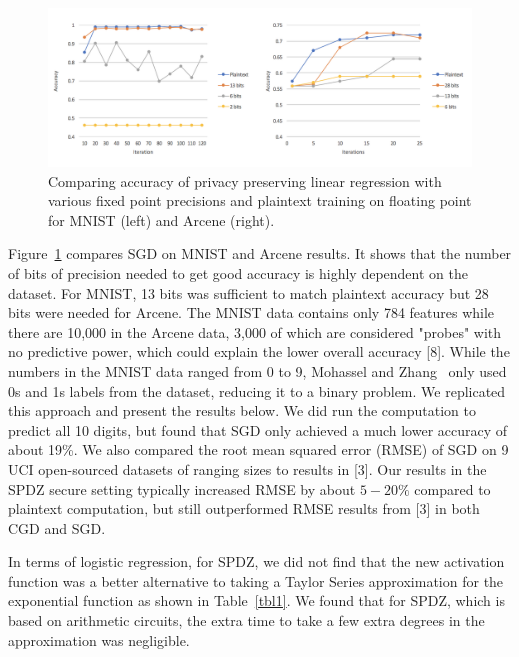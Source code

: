 \documentclass{article}
\begin{document}
\begin{figure}[h!]
\vspace{-4mm}
\centering
  \includegraphics[scale=0.6]{mnistarcene.png}
  \vspace{-4mm}
   \caption{Comparing accuracy of privacy preserving linear regression with various fixed point precisions and plaintext training on floating point for MNIST (left) and Arcene (right).}
   \label{fig:result2}  
\end{figure}

Figure~\ref{fig:result2} compares SGD on MNIST and Arcene results. It shows that the number of bits of precision needed to get good accuracy is highly dependent on the dataset. For MNIST, 13 bits was sufficient to match plaintext accuracy but 28 bits were needed for Arcene. The MNIST data contains only 784 features while there are 10,000 in the Arcene data, 3,000 of which are considered "probes" with no predictive power, which could explain the lower overall accuracy [8]. While the numbers in the MNIST data ranged from 0 to 9, Mohassel and Zhang~\cite{MZ17} only used 0s and 1s labels from the dataset, reducing it to a binary problem. We replicated this approach and present the results below. We did run the computation to predict all 10 digits, but found that SGD only achieved a much lower accuracy of about 19\%. We also compared the root mean squared error (RMSE) of SGD on 9 UCI open-sourced datasets of ranging sizes to results in [3]. Our results in the SPDZ secure setting typically increased RMSE by about $5-20\%$ compared to plaintext computation, but still outperformed RMSE results from [3] in both CGD and SGD.

In terms of logistic regression, for SPDZ, we did not find that the new activation function was a better alternative to taking a Taylor Series approximation for the exponential function as shown in Table~\ref{tbl1}. We found that for SPDZ, which is based on arithmetic circuits, the extra time to take a few extra degrees in the approximation was negligible.  
\end{document}
